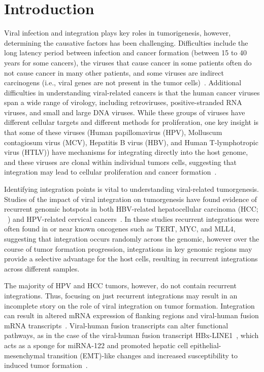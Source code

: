 \documentclass{bioinfo}
\begin{document}
\maketitle

\section{Introduction}
Viral infection and integration plays key roles in tumorigenesis, however, determining the causative factors has been challenging.  Difficulties include the long latency period between infection and cancer formation (between 15 to 40 years for some cancers), the viruses that cause cancer in some patients often do not cause cancer in many other patients, and some viruses are indirect carcinogens (i.e., viral genes are not present in the tumor cells)~\cite{Hausen2009}.  Additional difficulties in understanding viral-related cancers is that the human cancer viruses span a wide range of virology, including retroviruses, positive-stranded RNA viruses, and small and large DNA viruses.  While these groups of viruses have different cellular targets and different methods for proliferation, one key insight is that some of these viruses (Human papillomavirus (HPV), Molluscum contagiosum virus (MCV), Hepatitis B virus (HBV), and Human T-lymphotropic virus (HTLV)) have mechanisms for integrating directly into the host genome, and these viruses are clonal within individual tumors cells, suggesting that integration may lead to cellular proliferation and cancer formation~\cite{Moore2010}.

Identifying integration points is vital to understanding viral-related tumorgenesis.  Studies of the impact of viral integration on tumorgenesis have found evidence of recurrent genomic hotspots in both HBV-related hepatocellular carcinoma (HCC; ~\cite{Ding2012, Khoury2013}) and HPV-related cervical cancers~\cite{Schmitz2012}.  In these studies recurrent integrations were often found in or near known oncogenes such as TERT, MYC, and MLL4, suggesting that integration occurs randomly across the genomic, however over the course of tumor formation progression, integrations in key genomic regions may provide a selective advantage for the host cells, resulting in recurrent integrations across different samples.  

The majority of HPV and HCC tumors, however, do not contain recurrent integrations.  Thus, focusing on just recurrent integrations may result in an incomplete story on the role of viral integration on tumor formation.  Integration can result in altered mRNA expression of flanking regions and viral-human fusion mRNA transcripts~\cite{Tang2013}.  Viral-human fusion transcripts can alter functional pathways, as in the case of the viral-human fusion transcript HBx-LINE1~\cite{Lau2014}, which acts as a sponge for miRNA-122 and promoted hepatic cell epithelial-mesenchymal transition (EMT)-like changes and increased susceptibility to induced tumor formation~\cite{Liang2016}.  
\end{document}

